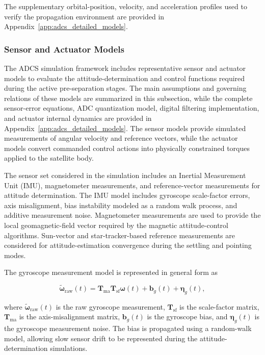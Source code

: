 The supplementary orbital-position, velocity, and acceleration profiles used to verify the propagation environment are provided in Appendix~\ref{app:adcs_detailed_models}.

\newpage
\subsubsection{Sensor and Actuator Models}
\label{subsub:adcs_sensor_actuator_models}
The ADCS simulation framework includes representative sensor and actuator models to evaluate the attitude-determination and control functions required during the active pre-separation stages. The main assumptions and governing relations of these models are summarized in this subsection, while the complete sensor-error equations, ADC quantization model, digital filtering implementation, and actuator internal dynamics are provided in Appendix~\ref{app:adcs_detailed_models}. The sensor models provide simulated measurements of angular velocity and reference vectors, while the actuator models convert commanded control actions into physically constrained torques applied to the satellite body.

The sensor set considered in the simulation includes an Inertial Measurement Unit (IMU), magnetometer measurements, and reference-vector measurements for attitude determination. The IMU model includes gyroscope scale-factor errors, axis misalignment, bias instability modeled as a random walk process, and additive measurement noise. Magnetometer measurements are used to provide the local geomagnetic-field vector required by the magnetic attitude-control algorithms. Sun-vector and star-tracker-based reference measurements are considered for attitude-estimation convergence during the settling and pointing modes.

The gyroscope measurement model is represented in general form as

\begin{equation}
    \tilde{\boldsymbol{\omega}}_{\mathrm{raw}}(t)
    =
    \mathbf{T}_{\mathrm{ma}}
    \mathbf{T}_{\mathrm{sf}}
    \boldsymbol{\omega}(t)
    +
    \mathbf{b}_{g}(t)
    +
    \boldsymbol{\eta}_{g}(t),
    \label{eq:adcs_gyro_measurement}
\end{equation}

where \(\tilde{\boldsymbol{\omega}}_{\mathrm{raw}}(t)\) is the raw gyroscope measurement, \(\mathbf{T}_{\mathrm{sf}}\) is the scale-factor matrix, \(\mathbf{T}_{\mathrm{ma}}\) is the axis-misalignment matrix, \(\mathbf{b}_{g}(t)\) is the gyroscope bias, and \(\boldsymbol{\eta}_{g}(t)\) is the gyroscope measurement noise. The bias is propagated using a random-walk model, allowing slow sensor drift to be represented during the attitude-determination simulations.

